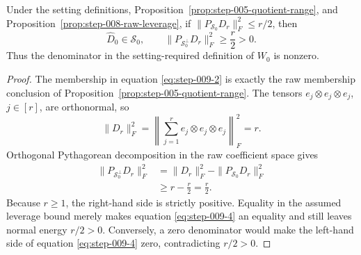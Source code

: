 \begin{lemma}
\label{lem:step-009-normal-energy}
Under the setting definitions,
Proposition~\ref{prop:step-005-quotient-range}, and
Proposition~\ref{prop:step-008-raw-leverage}, if
\(\|P_{\mathscr S_0}D_r\|_F^2\le r/2\), then
\begin{equation}
  \widehat D_0\in\mathscr S_0,
  \qquad
  \|P_{\mathscr S_0^\perp}D_r\|_F^2\ge\frac r2>0.
  \label{eq:step-009-2}
\end{equation}
Thus the denominator in the setting-required definition of \(W_0\) is
nonzero.

\end{lemma}

\begin{proof}
The membership in equation \eqref{eq:step-009-2} is exactly the raw
membership conclusion of
Proposition~\ref{prop:step-005-quotient-range}. The tensors
\(e_j\otimes e_j\otimes e_j\), \(j\in[r]\), are orthonormal, so
\begin{equation}
  \|D_r\|_F^2
  =\left\|\sum_{j=1}^r e_j\otimes e_j\otimes e_j\right\|_F^2
  =r.
  \label{eq:step-009-3}
\end{equation}
Orthogonal Pythagorean decomposition in the raw coefficient space gives
\begin{equation}
\begin{aligned}
  \|P_{\mathscr S_0^\perp}D_r\|_F^2
  &=\|D_r\|_F^2-\|P_{\mathscr S_0}D_r\|_F^2\\
  &\ge r-\frac r2
   =\frac r2.
\end{aligned}\label{eq:step-009-4}
\end{equation}
Because \(r\ge1\), the right-hand side is strictly positive. Equality in
the assumed leverage bound merely makes equation \eqref{eq:step-009-4} an equality and still leaves normal energy
\(r/2>0\). Conversely, a zero denominator would make the left-hand side of
equation \eqref{eq:step-009-4} zero, contradicting \(r/2>0\). 

\end{proof}


